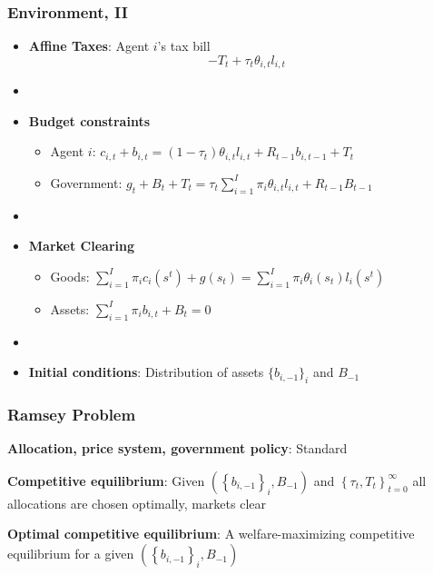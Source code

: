 \documentclass{beamer}
\begin{document}
\begin{frame}
 \frametitle{Environment, II}
 \begin{itemize}
  \item \textbf{Affine Taxes}: Agent $i$'s tax bill
\[- T_t + \tau_t \theta_{i,t}l_{i,t}\]

\item[]
  \item \textbf{Budget constraints}
  \begin{itemize}
   \item Agent $i$: $ c_{i,t}+b_{i,t}=\left( 1-\tau _{t}\right) \theta _{i,t}l_{i,t}+R_{t-1}b_{i,t-1}+T_{t}$
\item Government: $g_{t}+B_{t}+T_t=\tau _{t}\sum_{i=1}^{I}\pi _{i}\theta_{i,t}l_{i,t}+R_{t-1}B_{t-1}$
  \end{itemize}

\item[]
  \item \textbf{Market Clearing}
  \begin{itemize}
   \item Goods: $\sum_{i=1}^{I}\pi_{i}c_{i}(s^t)+g\left( s_{t}\right) =\sum_{i=1}^{I}\pi
_{i}\theta _{i}\left( s_{t}\right) l_{i}(s^t)$

   \item Assets: $\sum_{i=1}^{I}\pi _{i}b_{i,t}+B_{t}=0$

  \end{itemize}
  \item[]

\item \textbf{Initial conditions}: Distribution of assets $\{b_{i,-1}\}_i$ and $B_{-1}$
\end{itemize}
\end{frame}


\begin{frame}
 \frametitle{Ramsey Problem}

\begin{definition}
\textbf{Allocation, price system, government policy}: Standard

\end{definition}

\begin{definition}
\textbf{Competitive equilibrium}: Given $\left( \left\{ b_{i,-1}\right\}
_{i},B_{-1}\right) $ and $\left\{ \tau _{t},T_{t}\right\} _{t=0}^{\infty }$
all allocations are chosen optimally, markets clear
\end{definition}

\begin{definition}
\textbf{Optimal competitive equilibrium}: A welfare-maximizing competitive
equilibrium for a given $\left( \left\{ b_{i,-1}\right\} _{i},B_{-1}\right) $
\end{definition}

 \end{frame}
\end{document}

